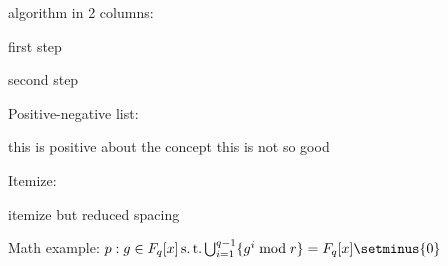 algorithm in 2 columns:
\begin{algo2c}
	\item first step
	\item second step
\end{algo2c}

Positive-negative list:
\begin{posNeg}
	\PNpos this is positive about the concept
	\PNneg this is not so good
\end{posNeg}

Itemize:
\begin{itemm}
	\item itemize but reduced spacing
\end{itemm}

Math example:
$p: g \in F_q[x] \st \bigcup_{i=1}^{q-1} \{g^i \bmod r\} = F_q[x]\setminus\{0\}$
